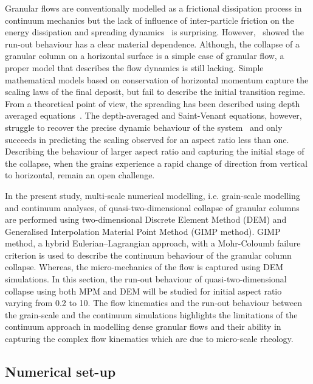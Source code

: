 Granular flows are conventionally modelled as a frictional dissipation process 
in continuum mechanics but the lack of influence of inter-particle friction on 
the energy dissipation and spreading dynamics~\citep{Lube2005} is surprising. 
However,~\citet{Kerswell2005} showed the run-out behaviour has a clear material 
dependence. Although, the collapse of a granular column on a 
horizontal surface is a simple case of granular flow, a proper model 
that describes the flow dynamics is still lacking. Simple mathematical models 
based on conservation of horizontal momentum capture the scaling laws of the 
final deposit, but fail to describe the initial transition regime. From a 
theoretical point of view, the spreading has been described using depth 
averaged equations~\citep{Kerswell2005,Larrieu2006}. The depth-averaged and 
Saint-Venant equations, however, struggle to recover the precise dynamic 
behaviour of the system~\citep{Warnett2013} and only succeeds in predicting the 
scaling observed for an aspect ratio less than one. Describing the behaviour of 
larger aspect ratio and capturing the initial stage of the collapse, when the 
grains experience a rapid change of direction from vertical to horizontal, 
remain an open challenge.


In the present study, multi-scale numerical modelling, i.e. grain-scale 
modelling and continuum analyses, of quasi-two-dimensional collapse of 
granular columns are performed using two-dimensional Discrete Element Method 
(DEM) and Generalised Interpolation Material Point Method (GIMP method). GIMP 
method, a 
hybrid Eulerian--Lagrangian approach, with a Mohr-Coloumb failure criterion is 
used to describe the continuum behaviour of the granular column collapse. 
Whereas, the micro-mechanics of the flow is captured using DEM simulations. 
In this section, the run-out behaviour of quasi-two-dimensional collapse using 
both MPM and DEM will be studied for initial aspect ratio varying from 0.2 to 
10. The flow kinematics and the run-out behaviour between the grain-scale and 
the continuum simulations highlights the limitations of the continuum approach 
in modelling dense granular flows and their ability in capturing the complex 
flow kinematics which are due to micro-scale rheology.

\subsection{Numerical set-up}

